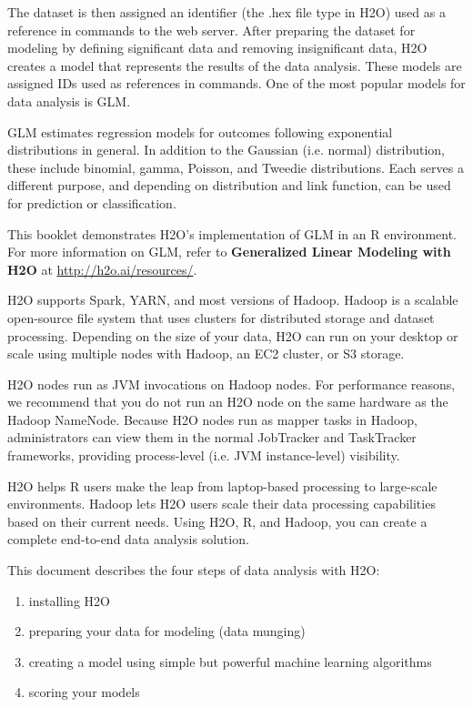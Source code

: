 {The dataset is then assigned an identifier (the .hex file type in H2O) used as a reference in  commands to the web server. After preparing the dataset for modeling by defining significant data and removing insignificant data, H2O creates a model that represents the results of the data analysis. These models are assigned IDs used as references in commands. One of the most popular models for data analysis is GLM. 

GLM estimates regression models for outcomes following exponential distributions in general. In addition to the Gaussian (i.e. normal) distribution, these include binomial, gamma, Poisson, and Tweedie distributions. Each serves a different purpose, and depending on distribution and link function, can be used for prediction or classification.

This booklet demonstrates H2O's implementation of GLM in an R environment. For more information on GLM, refer to \textbf{Generalized Linear Modeling with H2O} at {\url{http://h2o.ai/resources/}}. 

H2O supports Spark, YARN, and most versions of Hadoop. Hadoop is a scalable open-source file system that uses clusters for distributed storage and dataset processing. Depending on the size of your data, H2O can run on your desktop or scale using multiple nodes with Hadoop, an EC2 cluster, or S3 storage. 

H2O nodes run as JVM invocations on Hadoop nodes. For performance reasons, we recommend that you do not run an H2O node on the same hardware as the Hadoop NameNode. Because H2O nodes run as mapper tasks in Hadoop, administrators can view them in the normal JobTracker and TaskTracker frameworks, providing process-level (i.e. JVM instance-level) visibility.

H2O helps R users make the leap from laptop-based processing to large-scale environments. Hadoop lets H2O users scale their data processing capabilities based on their current needs. Using H2O, R, and Hadoop, you can create a complete end-to-end data analysis solution. 

This document describes the four steps of data analysis with H2O: 
\begin{enumerate}

\item installing H2O
\item preparing your data for modeling (data munging)
\item creating a model using simple but powerful machine learning algorithms
\item scoring your models


\end{enumerate}}
